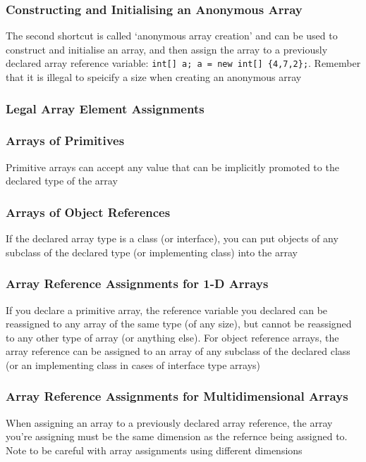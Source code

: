 \subsubsection{Constructing and Initialising an Anonymous Array}
The second shortcut is called `anonymous array creation' and can be used to 
construct and initialise an array, and then assign the array to a previously 
declared array reference variable: \verb#int[] a; a = new int[] {4,7,2};#.  
Remember that it is illegal to speicify a size when creating an anonymous array

\subsubsection{Legal Array Element Assignments}
\subsubsection{Arrays of Primitives}
Primitive arrays can accept any value that can be implicitly promoted to the 
declared type of the array

\subsubsection{Arrays of Object References}
If the declared array type is a class (or interface), you can put objects of 
any subclass of the declared type (or implementing class) into the array

\subsubsection{Array Reference Assignments for 1-D Arrays}
If you declare a primitive array, the reference variable you declared can be 
reassigned to any array of the same type (of any size), but cannot be 
reassigned to any other type of array (or anything else). For object reference 
arrays, the array reference can be assigned to an array of any subclass of the 
declared class (or an implementing class in cases of interface type arrays)

\subsubsection{Array Reference Assignments for Multidimensional Arrays}
When assigning an array to a previously declared array reference, the array 
you're assigning must be the same dimension as the refernce being assigned to.  
Note to be careful with array assignments using different dimensions

